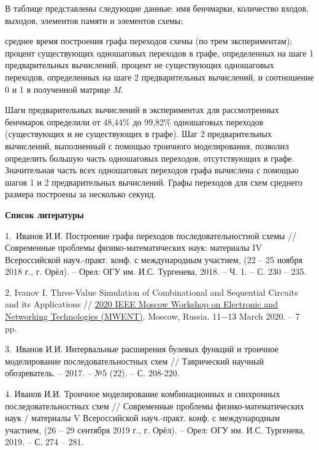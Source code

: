\documentclass[a4paper,11pt]{article}
\begin{document}
\vspace{0.3cm}

В таблице представлены следующие данные: имя бенчмарки, количество входов, выходов,
элементов памяти и элементов схемы;

\newpage

среднее время построения графа переходов схемы (по трем экспериментам); процент существующих одношаговых переходов в графе, определенных на шаге 1 предварительных вычислений, процент не существующих одношаговых переходов, определенных на шаге 2 предварительных вычислений, и соотношение 0 и 1 в полученной матрице \textit{M}. 

Шаги предварительных вычислений в экспериментах для рассмотренных бенчмарок определили от 48,44\% до 99,82\% одношаговых переходов (существующих и не существующих в графе). Шаг 2 предварительных вычислений, выполненный с помощью троичного моделирования, позволил определить большую часть одношаговых переходов, отсутствующих в графе. Значительная часть всех одношаговых переходов графа вычислена с помощью шагов 1 и 2 предварительных вычислений. Графы переходов для схем среднего размера построены за несколько секунд. 

 

\begin{center} 
\textbf{Список литературы}
\end{center}

 1. Иванов И.И. Построение графа переходов последовательностной схемы // Современные проблемы физико-математических наук: материалы IV Всероссийской науч.-практ. конф. с международным участием, (22 – 25 ноября 2018 г., г. Орёл). – Орел: ОГУ им. И.С. Тургенева, 2018. – Ч. 1. – С. 230 – 235. 

2. Ivanov I. Three-Value Simulation of Combinational and Sequential Circuits and its Applications // \href{https://ieeexplore.ieee.org/xpl/mostRecentIssue.jsp?punumber=8398195}{2020 IEEE Moscow Workshop on Electronic and Networking Technologies (MWENT)}. Moscow, Russia. 11−13 March 2020. – 7 pp.

3. Иванов И.И. Интервальные расширения булевых функций и троичное моделирование последовательностных схем // Таврический научный обозреватель. – 2017. – №5 (22). – С. 208-220.

4. Иванов И.И. Троичное моделирование комбинационных и синхронных последовательностных схем // Современные проблемы физико-математических наук / материалы V Всероссийской науч.-практ. конф. с международным участием, (26 – 29 сентября 2019 г., г. Орёл). – Орел: ОГУ им. И.С. Тургенева, 2019. – С. 274 – 281.
\end{document}
